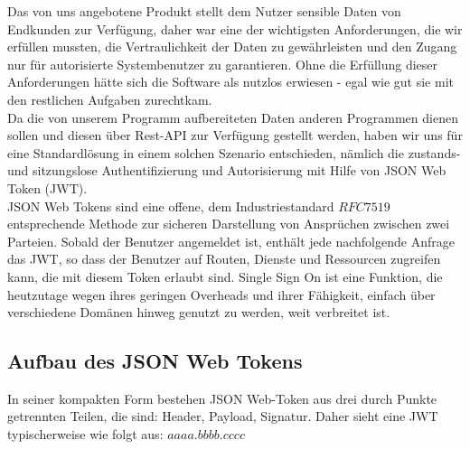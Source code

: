  \label{section:security}
Das von uns angebotene Produkt stellt dem Nutzer sensible Daten von Endkunden zur Verfügung, daher war eine der wichtigsten Anforderungen, die wir erfüllen mussten, die Vertraulichkeit der Daten zu gewährleisten und den Zugang nur für autorisierte Systembenutzer zu garantieren. Ohne die Erfüllung dieser Anforderungen hätte sich die Software als nutzlos erwiesen - egal wie gut sie mit den restlichen Aufgaben zurechtkam.\\ 
Da die von unserem Programm aufbereiteten Daten anderen Programmen dienen sollen und diesen über Rest-API zur Verfügung gestellt werden, haben wir uns für eine Standardlösung in einem solchen Szenario entschieden, nämlich die zustands- und sitzungslose Authentifizierung und Autorisierung mit Hilfe von JSON Web Token (JWT).\\ 
JSON Web Tokens sind eine offene, dem Industriestandard $RFC 7519$ entsprechende Methode zur sicheren Darstellung von Ansprüchen zwischen zwei Parteien. Sobald der Benutzer angemeldet ist, enthält jede nachfolgende Anfrage das JWT, so dass der Benutzer auf Routen, Dienste und Ressourcen zugreifen kann, die mit diesem Token erlaubt sind. Single Sign On ist eine Funktion, die heutzutage wegen ihres geringen Overheads und ihrer Fähigkeit, einfach über verschiedene Domänen hinweg genutzt zu werden, weit verbreitet ist.
\subsection{Aufbau des JSON Web Tokens}
In seiner kompakten Form bestehen JSON Web-Token aus drei durch Punkte getrennten Teilen, die sind: Header, Payload, Signatur. Daher sieht eine JWT typischerweise wie folgt aus: $aaaa.bbbb.cccc$

